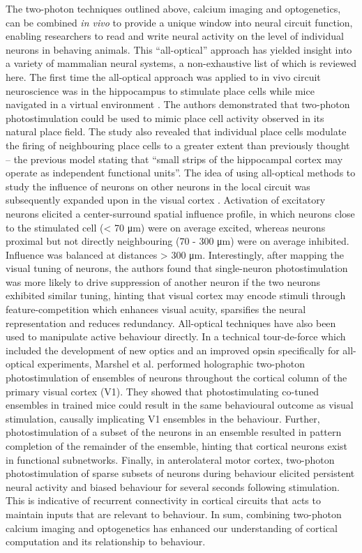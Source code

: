 The two-photon techniques outlined above, calcium imaging and optogenetics, can be combined \textit{in vivo} to provide a unique window into neural circuit function, enabling researchers to read and write neural activity on the level of individual neurons in behaving animals. This “all-optical” approach has yielded insight into a variety of mammalian neural systems, a non-exhaustive list of which is reviewed here. The first time the all-optical approach was applied to in vivo circuit neuroscience was in the hippocampus to stimulate place cells while mice navigated in a virtual environment \cite{rickgauer_simultaneous_2014}. The authors demonstrated that two-photon photostimulation could be used to mimic place cell activity observed in its natural place field. The study also revealed that individual place cells modulate the firing of neighbouring place cells to a greater extent than previously thought -- the previous model \cite{andersen_lamellar_1971} stating that “small strips of the hippocampal cortex may operate as independent functional units”. The idea of using all-optical methods to study the influence of neurons on other neurons in the local circuit was subsequently expanded upon in the visual cortex \cite{chettih_single-neuron_2019}. Activation of excitatory neurons elicited a center-surround spatial influence profile, in which neurons close to the stimulated cell (< 70 μm) were on average excited, whereas neurons proximal but not directly neighbouring (70 - 300 μm) were on average inhibited. Influence was balanced at distances > 300 μm. Interestingly, after mapping the visual tuning of neurons, the authors found that single-neuron photostimulation was more likely to drive suppression of another neuron if the two neurons exhibited similar tuning, hinting that visual cortex may encode stimuli through feature-competition which enhances visual acuity, sparsifies the neural representation and reduces redundancy. All-optical techniques have also been used to manipulate active behaviour directly. In a technical tour-de-force which included the development of new optics and an improved opsin specifically for all-optical experiments, Marshel et al. \cite{marshel_cortical_2019} performed holographic two-photon photostimulation of ensembles of neurons throughout the cortical column of the primary visual cortex (V1). They showed that photostimulating co-tuned ensembles in trained mice could result in the same behavioural outcome as visual stimulation, causally implicating V1 ensembles in the behaviour. Further, photostimulation of a subset of the neurons in an ensemble resulted in pattern completion of the remainder of the ensemble, hinting that cortical neurons exist in functional subnetworks. Finally, in anterolateral motor cortex, two-photon photostimulation of sparse subsets of neurons during behaviour elicited persistent neural activity and biased behaviour for several seconds following stimulation. This is indicative of recurrent connectivity in cortical circuits that acts to maintain inputs that are relevant to behaviour. In sum, combining two-photon calcium imaging and optogenetics has enhanced our understanding of cortical computation and its relationship to behaviour. 


